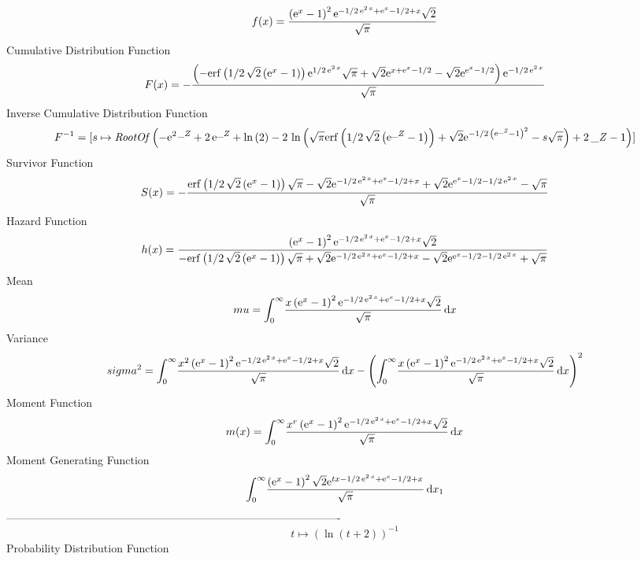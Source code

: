 \documentclass[12pt]{article}
\begin{document}
$$  f(x)={\frac { \left( {{\rm e}^{x}}-1 \right) ^{2}{{\rm e}^{-1/2\,{{\rm e}^{
2\,x}}+{{\rm e}^{x}}-1/2+x}}\sqrt {2}}{\sqrt {\pi}}}
$$Cumulative Distribution Function  
 $$F(x)=-{\frac { \left( -{\rm erf} \left(1/2\,\sqrt {2} \left( {{\rm e}^{x}}-
1 \right) \right){{\rm e}^{1/2\,{{\rm e}^{2\,x}}}}\sqrt {\pi}+\sqrt {2
}{{\rm e}^{x+{{\rm e}^{x}}-1/2}}-\sqrt {2}{{\rm e}^{{{\rm e}^{x}}-1/2}
} \right) {{\rm e}^{-1/2\,{{\rm e}^{2\,x}}}}}{\sqrt {\pi}}}
$$ Inverse Cumulative Distribution Function 
  $$F^{-1} = [s\mapsto {\it RootOf} \left( -{{\rm e}^{2\,{\it \_Z}}}+2\,{{\rm e}^{{
\it \_Z}}}+\ln  \left( 2 \right) -2\,\ln  \left( \sqrt {\pi}{\rm erf} 
\left(1/2\,\sqrt {2} \left( {{\rm e}^{{\it \_Z}}}-1 \right) \right)+
\sqrt {2}{{\rm e}^{-1/2\, \left( {{\rm e}^{{\it \_Z}}}-1 \right) ^{2}}
}-s\sqrt {\pi} \right) +2\,{\it \_Z}-1 \right) ]
$$Survivor Function 
 $$ S(x)=-{\frac {{\rm erf} \left(1/2\,\sqrt {2} \left( {{\rm e}^{x}}-1
 \right) \right)\sqrt {\pi}-\sqrt {2}{{\rm e}^{-1/2\,{{\rm e}^{2\,x}}+
{{\rm e}^{x}}-1/2+x}}+\sqrt {2}{{\rm e}^{{{\rm e}^{x}}-1/2-1/2\,{
{\rm e}^{2\,x}}}}-\sqrt {\pi}}{\sqrt {\pi}}}
$$ Hazard Function 
 $$ h(x)={\frac { \left( {{\rm e}^{x}}-1 \right) ^{2}{{\rm e}^{-1/2\,{{\rm e}^{
2\,x}}+{{\rm e}^{x}}-1/2+x}}\sqrt {2}}{-{\rm erf} \left(1/2\,\sqrt {2}
 \left( {{\rm e}^{x}}-1 \right) \right)\sqrt {\pi}+\sqrt {2}{{\rm e}^{
-1/2\,{{\rm e}^{2\,x}}+{{\rm e}^{x}}-1/2+x}}-\sqrt {2}{{\rm e}^{{
{\rm e}^{x}}-1/2-1/2\,{{\rm e}^{2\,x}}}}+\sqrt {\pi}}}
$$Mean 
 $$ mu=\int_{0}^{\infty }\!{\frac {x \left( {{\rm e}^{x}}-1 \right) ^{2}{
{\rm e}^{-1/2\,{{\rm e}^{2\,x}}+{{\rm e}^{x}}-1/2+x}}\sqrt {2}}{\sqrt 
{\pi}}}\,{\rm d}x
$$ Variance 
 $$ sigma^2 = \int_{0}^{\infty }\!{\frac {{x}^{2} \left( {{\rm e}^{x}}-1 \right) ^{2
}{{\rm e}^{-1/2\,{{\rm e}^{2\,x}}+{{\rm e}^{x}}-1/2+x}}\sqrt {2}}{
\sqrt {\pi}}}\,{\rm d}x- \left( \int_{0}^{\infty }\!{\frac {x \left( {
{\rm e}^{x}}-1 \right) ^{2}{{\rm e}^{-1/2\,{{\rm e}^{2\,x}}+{{\rm e}^{
x}}-1/2+x}}\sqrt {2}}{\sqrt {\pi}}}\,{\rm d}x \right) ^{2}
$$Moment Function 
 $$ m(x) = \int_{0}^{\infty }\!{\frac {{x}^{r} \left( {{\rm e}^{x}}-1 \right) ^{2
}{{\rm e}^{-1/2\,{{\rm e}^{2\,x}}+{{\rm e}^{x}}-1/2+x}}\sqrt {2}}{
\sqrt {\pi}}}\,{\rm d}x
$$ Moment Generating Function 
 $$\int_{0}^{\infty }\!{\frac { \left( {{\rm e}^{x}}-1 \right) ^{2}\sqrt 
{2}{{\rm e}^{tx-1/2\,{{\rm e}^{2\,x}}+{{\rm e}^{x}}-1/2+x}}}{\sqrt {
\pi}}}\,{\rm d}x_{{1}}
$$-------------------------------------------------------------------------------------------  \\$$t\mapsto  \left( \ln  \left( t+2 \right)  \right) ^{-1}
$$Probability Distribution Function 
\end{document}
